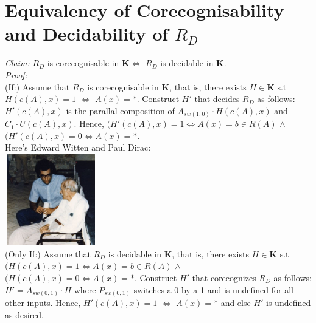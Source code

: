 \documentclass{article}
\newcommand{\K}{$\bm{K}$}
\begin{document}
\section{Equivalency of Corecognisability and Decidability of $R_D$}
\textit{Claim:} $R_D$ is corecognisable in \K{}$\iff{}$ $R_D$ is decidable in \K{}.\\

\noindent{}\textit{Proof:}\\
(If:) Assume that $R_D$ is corecognisable in \K{}, that is, there exists $H\in{}\bm{K}$ s.t $H(c(A), x)=1$ $\iff{}$ $A(x)=*$. Construct $H'$ that decides $R_D$ as follows: $H'(c(A),x)$ is the parallal composition of $A_{sw(1,0)}\cdot{}H(c(A),x)$ and $C_1 \cdot{} U(c(A),x)$. Hence, $(H'(c(A),x)=1\iff{}A(x)=b\in{}R(A)$ $\wedge{}$ $(H'(c(A),x)=0\iff{}A(x)=*$.\\

Here's Edward Witten and Paul Dirac: \\

\includegraphics[width=4cm, height=4cm]{wittenDirac.jpg}\\

\noindent{}(Only If:) Assume that $R_D$ is decidable in \K{}, that is, there exists $H\in{}\bm{K}$ s.t $(H(c(A),x)=1\iff{}A(x)=b\in{}R(A)$ $\wedge{}$ $(H(c(A),x)=0\iff{}A(x)=*$. Construct $H'$ that corecognizes $R_D$ as follows: $H'=A_{sw(0,1)}\cdot{}H$ where $P_{sw(0,1)}$ switches a 0 by a 1 and is undefined for all other inputs. Hence, $H'(c(A), x)=1$ $\iff{}$ $A(x)=*$ and else $H'$ is undefined as desired.  
\end{document}
